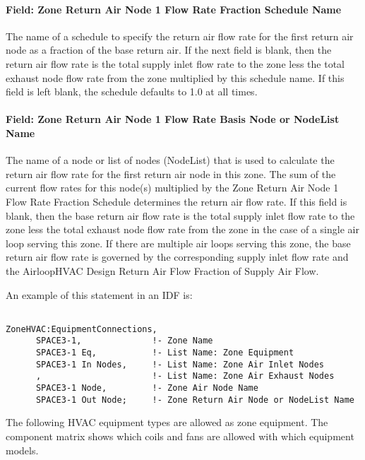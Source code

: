 \paragraph{Field: Zone Return Air Node 1 Flow Rate Fraction Schedule Name}\label{field-zone-return-air-flow-rate-fraction-schedule-name}

The name of a schedule to specify the return air flow rate for the first return air node as a fraction of the base return air. If the next field is blank, then the return air flow rate is the total supply inlet flow rate to the zone less the total exhaust node flow rate from the zone multiplied by this schedule name. If this field is left blank, the schedule defaults to 1.0 at all times.

\paragraph{Field: Zone Return Air Node 1 Flow Rate Basis Node or NodeList Name}\label{field-zone-return-air-flow-rate-basis-node-or-nodelist-name}

The name of a node or list of nodes (NodeList) that is used to calculate the return air flow rate for the first return air node in this zone. The sum of the current flow rates for this node(s) multiplied by the Zone Return Air Node 1 Flow Rate Fraction Schedule determines the return air flow rate. If this field is blank, then the base return air flow rate is the total supply inlet flow rate to the zone less the total exhaust node flow rate from the zone in the case of a single air loop serving this zone. If there are multiple air loops serving this zone, the base return air flow rate is governed by the corresponding supply inlet flow rate and the AirloopHVAC Design Return Air Flow Fraction of Supply Air Flow.

An example of this statement in an IDF is:

\begin{lstlisting}

ZoneHVAC:EquipmentConnections,
      SPACE3-1,              !- Zone Name
      SPACE3-1 Eq,           !- List Name: Zone Equipment
      SPACE3-1 In Nodes,     !- List Name: Zone Air Inlet Nodes
      ,                      !- List Name: Zone Air Exhaust Nodes
      SPACE3-1 Node,         !- Zone Air Node Name
      SPACE3-1 Out Node;     !- Zone Return Air Node or NodeList Name
\end{lstlisting}

The following HVAC equipment types are allowed as zone equipment. The component matrix shows which coils and fans are allowed with which equipment models.

